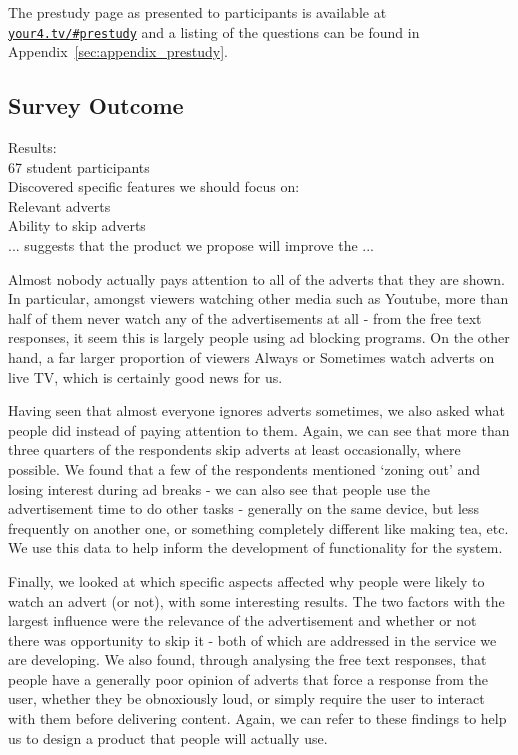 The prestudy page as presented to participants is available at \href{http://your4.tv/\#prestudy}{\texttt{your4.tv/\#prestudy}} and a listing of the questions can be found in Appendix~\ref{sec:appendix_prestudy}. %


\subsection{Survey Outcome}

Results:\\
67 student participants\\
Discovered specific features we should focus on:\\
Relevant adverts\\
Ability to skip adverts\\
... suggests that the product we propose will improve the ...

Almost nobody actually pays attention to all of the adverts that they are shown. In particular, amongst viewers watching other media such as Youtube, more than half of them never watch any of the advertisements at all - from the free text responses, it seem this is largely people using ad blocking programs. On the other hand, a far larger proportion of viewers Always or Sometimes watch adverts on live TV, which is certainly good news for us.

Having seen that almost everyone ignores adverts sometimes, we also asked what people did instead of paying attention to them. Again, we can see that more than three quarters of the respondents skip adverts at least occasionally, where possible. We found that a few of the respondents mentioned `zoning out' and losing interest during ad breaks - we can also see that people use the advertisement time to do other tasks - generally on the same device, but less frequently on another one, or something completely different like making tea, etc. We use this data to help inform the development of functionality for the system.

Finally, we looked at which specific aspects affected why people were likely to watch an advert (or not), with some interesting results. The two factors with the largest influence were the relevance of the advertisement and whether or not there was opportunity to skip it - both of which are addressed in the service we are developing. We also found, through analysing the free text responses, that people have a generally poor opinion of adverts that force a response from the user, whether they be obnoxiously loud, or simply require the user to interact with them before delivering content. Again, we can refer to these findings to help us to design a product that people will actually use. 
